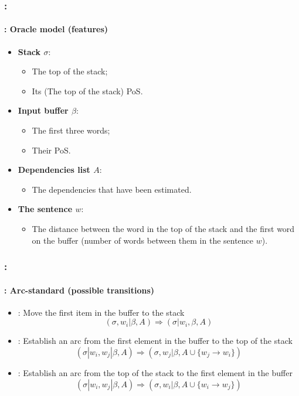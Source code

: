 \documentclass[xcolor=table]{beamer}
\begin{document}
\begin{frame}
	\frametitle{\insertshortsubtitle: \insertsection}
	\framesubtitle{\insertsubsection: Oracle model (features)}

	\begin{itemize}
		\item \textbf{Stack $\sigma$}:
		\begin{itemize}
			\item The top of the stack;
			\item Its (The top of the stack) PoS.
		\end{itemize}
	
		\item \textbf{Input buffer $\beta$}:
		\begin{itemize}
			\item The first three words;
			\item Their PoS.
		\end{itemize}
	
		\item \textbf{Dependencies list $A$}:
		\begin{itemize}
			\item The dependencies that have been estimated.
		\end{itemize}
	
		\item \textbf{The sentence $w$}:
		\begin{itemize}
			\item The distance between the word in the top of the stack and the first word on the buffer (number of words between them in the sentence $w$).
		\end{itemize}
	
	\end{itemize}

\end{frame}

\begin{frame}
	\frametitle{\insertshortsubtitle: \insertsection}
	\framesubtitle{\insertsubsection: Arc-standard (possible transitions)}

	\begin{itemize}
		\item {}: Move the first item in the buffer to the stack
		\[ (\sigma, w_i|\beta, A) \Rightarrow  (\sigma|w_i, \beta, A) \]
		
		\item {}: Establish an arc from the first element in the buffer to the top of the stack
		\[ (\sigma|w_i, w_j|\beta, A) \Rightarrow  (\sigma, w_j|\beta, A \cup \{w_j \rightarrow w_i \}) \] 
		
		\item {}: Establish an arc from the top of the stack to the first element in the buffer
		\[ (\sigma|w_i, w_j|\beta, A) \Rightarrow  (\sigma, w_i|\beta, A \cup \{w_i \rightarrow w_j \}) \] 
	\end{itemize}

\end{frame}
\end{document}

